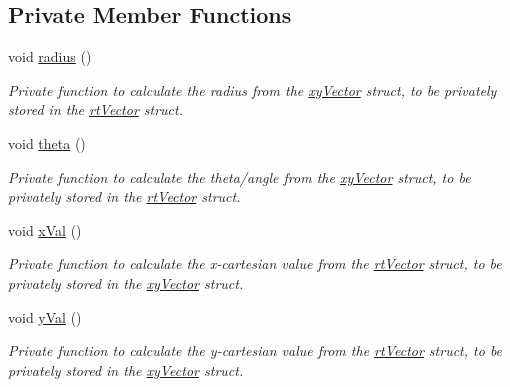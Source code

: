 \subsection*{Private Member Functions}
\begin{DoxyCompactItemize}
\item 
\mbox{\label{class_vector2_d_a86eb002af3d4ce9ee892691165577bd9}} 
void \hyperlink{class_vector2_d_a86eb002af3d4ce9ee892691165577bd9}{radius} ()
\begin{DoxyCompactList}\small\item\em Private function to calculate the radius from the \hyperlink{structxy_vector}{xy\+Vector} struct, to be privately stored in the \hyperlink{structrt_vector}{rt\+Vector} struct. \end{DoxyCompactList}\item 
\mbox{\label{class_vector2_d_a77801c0448846bc99cea64b232e262ed}} 
void \hyperlink{class_vector2_d_a77801c0448846bc99cea64b232e262ed}{theta} ()
\begin{DoxyCompactList}\small\item\em Private function to calculate the theta/angle from the \hyperlink{structxy_vector}{xy\+Vector} struct, to be privately stored in the \hyperlink{structrt_vector}{rt\+Vector} struct. \end{DoxyCompactList}\item 
\mbox{\label{class_vector2_d_a2aa1adc699bfc5a490875d26c1e6da04}} 
void \hyperlink{class_vector2_d_a2aa1adc699bfc5a490875d26c1e6da04}{x\+Val} ()
\begin{DoxyCompactList}\small\item\em Private function to calculate the x-\/cartesian value from the \hyperlink{structrt_vector}{rt\+Vector} struct, to be privately stored in the \hyperlink{structxy_vector}{xy\+Vector} struct. \end{DoxyCompactList}\item 
\mbox{\label{class_vector2_d_ab202ce3f9065cdbf5d981b0f34c66feb}} 
void \hyperlink{class_vector2_d_ab202ce3f9065cdbf5d981b0f34c66feb}{y\+Val} ()
\begin{DoxyCompactList}\small\item\em Private function to calculate the y-\/cartesian value from the \hyperlink{structrt_vector}{rt\+Vector} struct, to be privately stored in the \hyperlink{structxy_vector}{xy\+Vector} struct. \end{DoxyCompactList}\end{DoxyCompactItemize}
